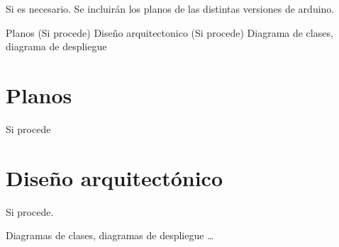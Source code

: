 
Si es necesario.
Se incluirán los planos de las distintas versiones de arduino.


    Planos (Si procede)
    Diseño arquitectonico (Si procede)
        Diagrama de clases, diagrama de despliegue

\section{Planos}

Si procede

\section{Diseño arquitectónico}

Si procede.

Diagramas de clases, diagramas de despliegue \ldots

